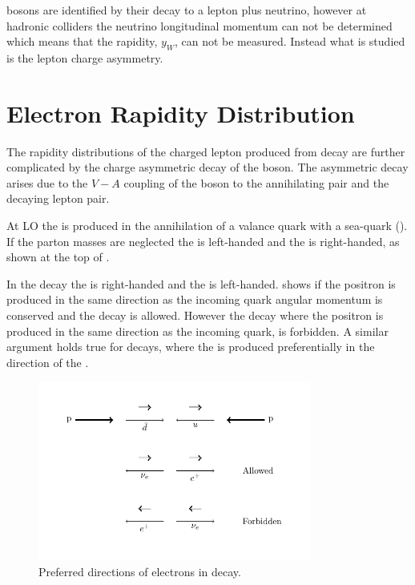 \PW bosons are identified by their decay to a lepton plus neutrino, however at
hadronic colliders the neutrino longitudinal momentum can not be determined
which means that the \PW rapidity, $y_{W}$, can not be measured.  Instead what
is studied is the lepton charge asymmetry.


\section{Electron Rapidity Distribution}

The rapidity distributions of the charged lepton produced from \PW decay are
further complicated by the charge asymmetric decay of the \PWpm boson. 
The asymmetric decay arises due to the $V-A$ coupling of the \PW boson to the
annihilating \HepProcess{\Pquark\APquark} pair and the decaying lepton pair.

At \ac{LO} the \PWp is produced in the annihilation of a \Pup valance quark
with a \APdown sea-quark (). 
If the parton masses are neglected the \Pup is left-handed and the \APdown is
right-handed, as shown at the top of . 

In the \PWp decay the \Ppositron is right-handed and the \Pnue is left-handed.
 shows if the  positron is produced in the same direction
as the incoming \APdown quark angular momentum is conserved and the decay is
allowed.
However the decay where the positron is produced in the same direction as the
incoming \Pup quark, is forbidden.
A similar argument holds true for \PWm decays, where the \Pelectron is produced
preferentially in the direction of the \Pdown.

\begin{figure}[htb]
  \centering
  \includegraphics[width=0.8\textwidth]{w_decay_directions}
  \caption{Preferred directions of electrons in \Wenu decay.\cite{TODO}}
  \label{wbos:wspin}
\end{figure}

